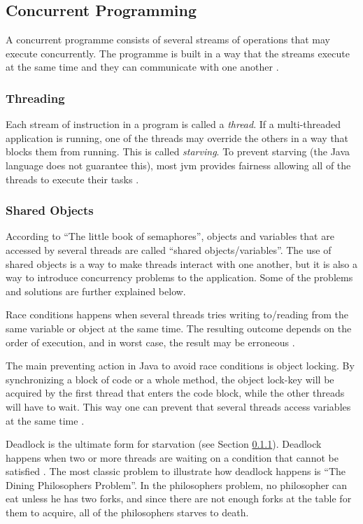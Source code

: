 \subsection{Concurrent Programming}
\label{sec:concurrentprog}
A concurrent programme consists of several streams of operations that may execute concurrently. The programme is built in a way that the streams execute at the same time and they can communicate with one another \cite{cartwright2000}.

\subsubsection{Threading}
\label{sec:threading}
Each stream of instruction in a program is called a \textit{thread}. If a multi-threaded application is running, one of the threads may override the others in a way that blocks them from running. This is called \textit{starving}. To prevent starving (the Java language does not guarantee this), most \acrshort{jvm} provides fairness allowing all of the threads to execute their tasks \cite{cartwright2000}.

\subsubsection{Shared Objects}
\label{sec:sharedobj}
According to ``The little book of semaphores''\cite{downey2008}, objects and variables that are accessed by several threads are called ``shared objects/variables''. The use of shared objects is a way to make threads interact with one another, but it is also a way to introduce concurrency problems to the application. Some of the problems and solutions are further explained below.

\label{sec:raisedcond}

Race conditions happens when several threads tries writing to/reading from the same variable or object at the same time. The resulting outcome depends on the order of execution, and in worst case, the result may be erroneous \cite{stevecarr2003}. 

\label{sec:synchronization}
The main preventing action in Java to avoid race conditions is object locking. By synchronizing a block of code or a whole method, the object lock-key will be acquired by the first thread that enters the code block, while the other threads will have to wait. This way one can prevent that several threads access variables at the same time \cite{cartwright2000}.

\newpage
{}
\label{sec:deadlock}
Deadlock is the ultimate form for starvation (see Section \ref{sec:threading}). Deadlock happens when two or more threads are waiting on a condition that cannot be satisfied \cite{sunmicrosystems2005}. The most classic problem to illustrate how deadlock happens is ``The Dining Philosophers Problem''\cite{cartwright2000v2}. In the philosophers problem, no philosopher can eat unless he has two forks, and since there are not enough forks at the table for them to acquire, all of the philosophers starves to death.